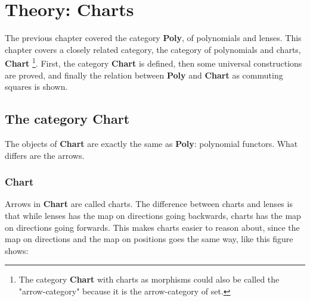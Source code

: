 \chapter{Theory: Charts}\label{chapter:charts}
The previous chapter covered the category \textbf{Poly}, of polynomials and lenses. This chapter covers a closely related category, the category of polynomials and charts, \textbf{Chart} 
\footnote{The category \textbf{Chart} with charts as morphisms could also be called the "arrow-category" because it is the arrow-category of set.}.
First, the category \textbf{Chart} is defined, then some universal constructions are proved, and finally the relation between \textbf{Poly} and \textbf{Chart} as commuting squares is shown.

\section{The category \textbf{Chart}}
The objects of \textbf{Chart} are exactly the same as \textbf{Poly}: polynomial functors. What differs are the arrows. 

\subsection{Chart}
Arrows in \textbf{Chart} are called charts. The difference between charts and lenses is that while lenses has the map on directions going backwards, charts has the map on directions going forwards. This makes charts easier to reason about, since the map on directions and the map on positions goes the same way, like this figure shows:

